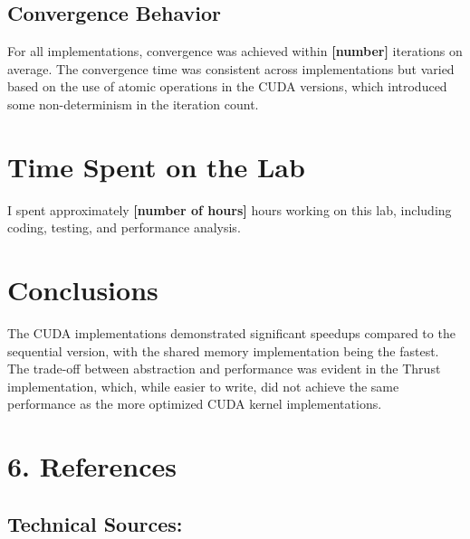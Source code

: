 \documentclass[letterpaper,12pt]{article}
\theoremstyle{remark}
\begin{document}
\subsection{Convergence Behavior}
For all implementations, convergence was achieved within \textbf{[number]} iterations on average. The convergence time was consistent across implementations but varied based on the use of atomic operations in the CUDA versions, which introduced some non-determinism in the iteration count.

\section{Time Spent on the Lab}
I spent approximately \textbf{[number of hours]} hours working on this lab, including coding, testing, and performance analysis.



\section*{Conclusions}

The CUDA implementations demonstrated significant speedups compared to the sequential version, with the shared memory implementation being the fastest. The trade-off between abstraction and performance was evident in the Thrust implementation, which, while easier to write, did not achieve the same performance as the more optimized CUDA kernel implementations.






\section*{6. References}


\subsection*{Technical Sources:}
\end{document}
